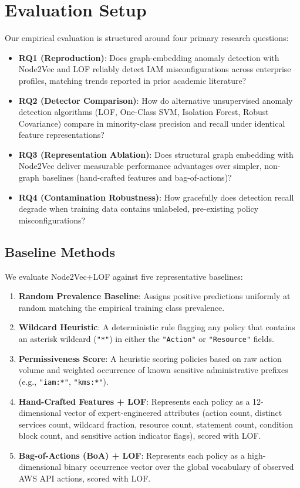 \section{Evaluation Setup}
\label{sec:eval_setup}

Our empirical evaluation is structured around four primary research questions:
\begin{itemize}
    \item \textbf{RQ1 (Reproduction)}: Does graph-embedding anomaly detection with Node2Vec and LOF reliably detect IAM misconfigurations across enterprise profiles, matching trends reported in prior academic literature?
    \item \textbf{RQ2 (Detector Comparison)}: How do alternative unsupervised anomaly detection algorithms (LOF, One-Class SVM, Isolation Forest, Robust Covariance) compare in minority-class precision and recall under identical feature representations?
    \item \textbf{RQ3 (Representation Ablation)}: Does structural graph embedding with Node2Vec deliver measurable performance advantages over simpler, non-graph baselines (hand-crafted features and bag-of-actions)?
    \item \textbf{RQ4 (Contamination Robustness)}: How gracefully does detection recall degrade when training data contains unlabeled, pre-existing policy misconfigurations?
\end{itemize}

\subsection{Baseline Methods}
We evaluate Node2Vec+LOF against five representative baselines:
\begin{enumerate}
    \item \textbf{Random Prevalence Baseline}: Assigns positive predictions uniformly at random matching the empirical training class prevalence.
    \item \textbf{Wildcard Heuristic}: A deterministic rule flagging any policy that contains an asterisk wildcard (\texttt{"*"}) in either the \texttt{"Action"} or \texttt{"Resource"} fields.
    \item \textbf{Permissiveness Score}: A heuristic scoring policies based on raw action volume and weighted occurrence of known sensitive administrative prefixes (e.g., \texttt{"iam:*"}, \texttt{"kms:*"}).
    \item \textbf{Hand-Crafted Features + LOF}: Represents each policy as a 12-dimensional vector of expert-engineered attributes (action count, distinct services count, wildcard fraction, resource count, statement count, condition block count, and sensitive action indicator flags), scored with LOF.
    \item \textbf{Bag-of-Actions (BoA) + LOF}: Represents each policy as a high-dimensional binary occurrence vector over the global vocabulary of observed AWS API actions, scored with LOF.
\end{enumerate}

